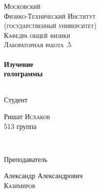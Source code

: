 \begin{titlepage}
\center %
 

\textsc{\LARGE Московский\\[-0.2cm]Физико-Технический Институт\\[0.1cm]\large (государственный университет)}\\[1.5cm] %
\textsc{\Large Кафедра общей физики}\\[0.1cm] %
\textsc{\large Лабораторная работа .5}\\[0.5cm] %


\HRule
\\[0.4cm]
{ \huge \bfseries Изучение\\[0.2cm]
голограммы}
\\[0.6cm] %
\HRule
\\[1.5cm]


 

\begin{minipage}{0.4\textwidth}
	\begin{flushleft} \large
		\textsf{Студент}
		
		Ришат \textsc{Исхаков} \\[-0.15cm]
		513 группа
	\end{flushleft}
\end{minipage}
~
\begin{minipage}{0.4\textwidth}
	\begin{flushright} \large
		\textsf{Преподаватель}
		
		Александр Александрович \\[-0.15cm]
		\textsc{Казимиров} %
	\end{flushright}
\end{minipage}


\end{titlepage}
